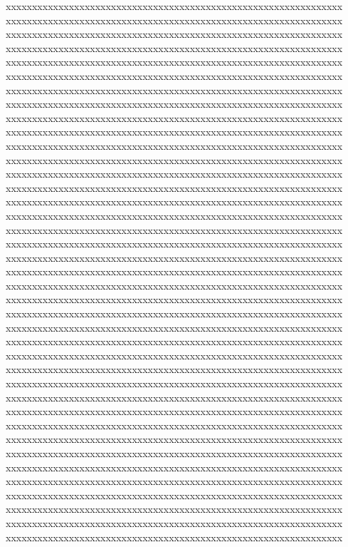 {\def\grab#1!{\def\a{#1}}\def\pass#1{\grab #1}\pass{xxxxxxxxxxxxxxxxxxxxxxxxxxxxxxxxxxxxxxxxxxxxxxxxxxxxxxxxxxxxxxxx%
xxxxxxxxxxxxxxxxxxxxxxxxxxxxxxxxxxxxxxxxxxxxxxxxxxxxxxxxxxxxxxxx%
xxxxxxxxxxxxxxxxxxxxxxxxxxxxxxxxxxxxxxxxxxxxxxxxxxxxxxxxxxxxxxxx%
xxxxxxxxxxxxxxxxxxxxxxxxxxxxxxxxxxxxxxxxxxxxxxxxxxxxxxxxxxxxxxxx%
xxxxxxxxxxxxxxxxxxxxxxxxxxxxxxxxxxxxxxxxxxxxxxxxxxxxxxxxxxxxxxxx%
xxxxxxxxxxxxxxxxxxxxxxxxxxxxxxxxxxxxxxxxxxxxxxxxxxxxxxxxxxxxxxxx%
xxxxxxxxxxxxxxxxxxxxxxxxxxxxxxxxxxxxxxxxxxxxxxxxxxxxxxxxxxxxxxxx%
xxxxxxxxxxxxxxxxxxxxxxxxxxxxxxxxxxxxxxxxxxxxxxxxxxxxxxxxxxxxxxxx%
xxxxxxxxxxxxxxxxxxxxxxxxxxxxxxxxxxxxxxxxxxxxxxxxxxxxxxxxxxxxxxxx%
xxxxxxxxxxxxxxxxxxxxxxxxxxxxxxxxxxxxxxxxxxxxxxxxxxxxxxxxxxxxxxxx%
xxxxxxxxxxxxxxxxxxxxxxxxxxxxxxxxxxxxxxxxxxxxxxxxxxxxxxxxxxxxxxxx%
xxxxxxxxxxxxxxxxxxxxxxxxxxxxxxxxxxxxxxxxxxxxxxxxxxxxxxxxxxxxxxxx%
xxxxxxxxxxxxxxxxxxxxxxxxxxxxxxxxxxxxxxxxxxxxxxxxxxxxxxxxxxxxxxxx%
xxxxxxxxxxxxxxxxxxxxxxxxxxxxxxxxxxxxxxxxxxxxxxxxxxxxxxxxxxxxxxxx%
xxxxxxxxxxxxxxxxxxxxxxxxxxxxxxxxxxxxxxxxxxxxxxxxxxxxxxxxxxxxxxxx%
xxxxxxxxxxxxxxxxxxxxxxxxxxxxxxxxxxxxxxxxxxxxxxxxxxxxxxxxxxxxxxxx%
xxxxxxxxxxxxxxxxxxxxxxxxxxxxxxxxxxxxxxxxxxxxxxxxxxxxxxxxxxxxxxxx%
xxxxxxxxxxxxxxxxxxxxxxxxxxxxxxxxxxxxxxxxxxxxxxxxxxxxxxxxxxxxxxxx%
xxxxxxxxxxxxxxxxxxxxxxxxxxxxxxxxxxxxxxxxxxxxxxxxxxxxxxxxxxxxxxxx%
xxxxxxxxxxxxxxxxxxxxxxxxxxxxxxxxxxxxxxxxxxxxxxxxxxxxxxxxxxxxxxxx%
xxxxxxxxxxxxxxxxxxxxxxxxxxxxxxxxxxxxxxxxxxxxxxxxxxxxxxxxxxxxxxxx%
xxxxxxxxxxxxxxxxxxxxxxxxxxxxxxxxxxxxxxxxxxxxxxxxxxxxxxxxxxxxxxxx%
xxxxxxxxxxxxxxxxxxxxxxxxxxxxxxxxxxxxxxxxxxxxxxxxxxxxxxxxxxxxxxxx%
xxxxxxxxxxxxxxxxxxxxxxxxxxxxxxxxxxxxxxxxxxxxxxxxxxxxxxxxxxxxxxxx%
xxxxxxxxxxxxxxxxxxxxxxxxxxxxxxxxxxxxxxxxxxxxxxxxxxxxxxxxxxxxxxxx%
xxxxxxxxxxxxxxxxxxxxxxxxxxxxxxxxxxxxxxxxxxxxxxxxxxxxxxxxxxxxxxxx%
xxxxxxxxxxxxxxxxxxxxxxxxxxxxxxxxxxxxxxxxxxxxxxxxxxxxxxxxxxxxxxxx%
xxxxxxxxxxxxxxxxxxxxxxxxxxxxxxxxxxxxxxxxxxxxxxxxxxxxxxxxxxxxxxxx%
xxxxxxxxxxxxxxxxxxxxxxxxxxxxxxxxxxxxxxxxxxxxxxxxxxxxxxxxxxxxxxxx%
xxxxxxxxxxxxxxxxxxxxxxxxxxxxxxxxxxxxxxxxxxxxxxxxxxxxxxxxxxxxxxxx%
xxxxxxxxxxxxxxxxxxxxxxxxxxxxxxxxxxxxxxxxxxxxxxxxxxxxxxxxxxxxxxxx%
xxxxxxxxxxxxxxxxxxxxxxxxxxxxxxxxxxxxxxxxxxxxxxxxxxxxxxxxxxxxxxxx%
xxxxxxxxxxxxxxxxxxxxxxxxxxxxxxxxxxxxxxxxxxxxxxxxxxxxxxxxxxxxxxxx%
xxxxxxxxxxxxxxxxxxxxxxxxxxxxxxxxxxxxxxxxxxxxxxxxxxxxxxxxxxxxxxxx%
xxxxxxxxxxxxxxxxxxxxxxxxxxxxxxxxxxxxxxxxxxxxxxxxxxxxxxxxxxxxxxxx%
xxxxxxxxxxxxxxxxxxxxxxxxxxxxxxxxxxxxxxxxxxxxxxxxxxxxxxxxxxxxxxxx%
xxxxxxxxxxxxxxxxxxxxxxxxxxxxxxxxxxxxxxxxxxxxxxxxxxxxxxxxxxxxxxxx%
xxxxxxxxxxxxxxxxxxxxxxxxxxxxxxxxxxxxxxxxxxxxxxxxxxxxxxxxxxxxxxxx%
xxxxxxxxxxxxxxxxxxxxxxxxxxxxxxxxxxxxxxxxxxxxxxxxxxxxxxxxxxxxxxxx%
}}

